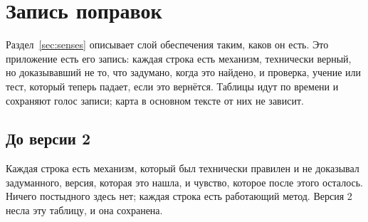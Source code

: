 \section{Запись поправок}
\label{app:corrections}

Раздел~\ref{sec:senses} описывает слой обеспечения таким, каков он есть. Это приложение есть его
запись: каждая строка есть механизм, технически верный, но доказывавший не то, что задумано, когда это
найдено, и проверка, учение или тест, который теперь падает, если это вернётся. Таблицы идут по времени
и сохраняют голос записи; карта в основном тексте от них не зависит.

\subsection*{До версии 2}

Каждая строка есть механизм, который был технически правилен и не доказывал задуманного, версия,
которая это нашла, и чувство, которое после этого осталось. Ничего постыдного здесь нет; каждая
строка есть работающий метод. Версия 2 несла эту таблицу, и она сохранена.


